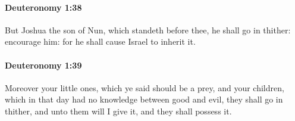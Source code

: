 		\paragraph{Deuteronomy 1:38} %
			\label{DEUTERONOMY-1-38}

			But Joshua the son of Nun, which standeth before thee, he shall go in thither: encourage him: for he shall cause Israel to inherit it.


		\paragraph{Deuteronomy 1:39} %
			\label{DEUTERONOMY-1-39}

			Moreover your little ones, which ye said should be a prey, and your children, which in that day had no knowledge between good and evil, they shall go in thither, and unto them will I give it, and they shall possess it.

